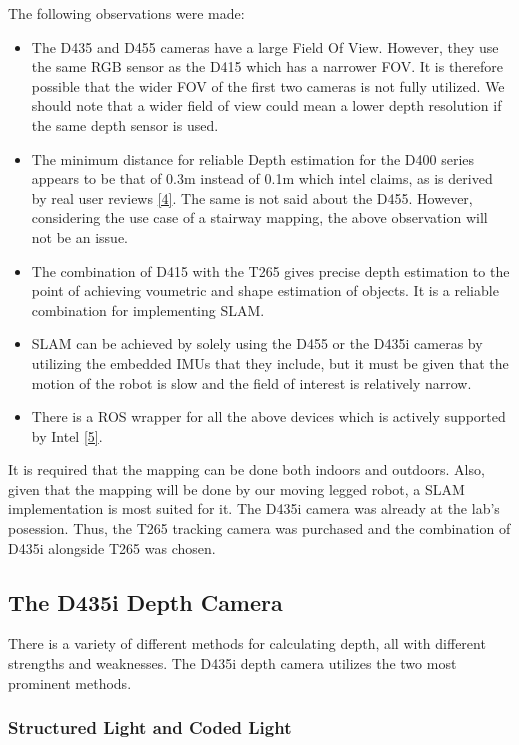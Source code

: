 \documentclass{article}
\begin{document}
The following observations were made:
\begin{itemize}
  \item The D435 and D455 cameras have a large Field Of View. However, they use the same RGB sensor as the D415 which has a narrower FOV. It is therefore possible that the wider FOV of the first two cameras is not fully utilized. We should note that a wider field of view could mean a lower depth resolution if the same depth sensor is used.
  \item The minimum distance for reliable Depth estimation for the D400 series appears to be that of 0.3m instead of 0.1m which intel claims, as is derived by real user reviews \href{https://www.youtube.com/watch?v=mFLZkdH1yLE}{[4]}. The same is not said about the D455. However, considering the use case of a stairway mapping, the above observation will not be an issue.
  \item The combination of D415 with the T265 gives precise depth estimation to the point of achieving voumetric and shape estimation of objects. It is a reliable combination for implementing SLAM.
  \item SLAM can be achieved by solely using the D455 or the D435i cameras by utilizing the embedded IMUs that they include, but it must be given that the motion of the robot is slow and the field of interest is relatively narrow.
  \item There is a ROS wrapper for all the above devices which is actively supported by Intel  \href{https://github.com/IntelRealSense/realsense-ros}{[5]}.
\end{itemize}

It is required that the mapping can be done both indoors and outdoors. Also, given that the mapping will be done by our moving legged robot, a SLAM implementation is most suited for it. 
The D435i camera was already at the lab’s posession. Thus, the T265 tracking camera was purchased and the combination of D435i alongside T265 was chosen.

\subsection{The D435i Depth Camera}

There is a variety of different methods for calculating depth, all with different strengths and weaknesses. The D435i depth camera utilizes the two most prominent methods. 

\subsubsection{Structured Light and Coded Light}
\end{document}
